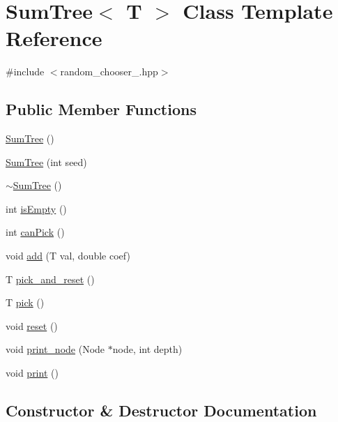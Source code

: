 \hypertarget{class_sum_tree}{}\section{Sum\+Tree$<$ T $>$ Class Template Reference}
\label{class_sum_tree}


{\ttfamily \#include $<$random\+\_\+chooser\+\_.\+hpp$>$}

\subsection*{Public Member Functions}
\begin{DoxyCompactItemize}
\item 
\hyperlink{class_sum_tree_a67f405b8c5b240375da744b9f095b992}{Sum\+Tree} ()
\item 
\hyperlink{class_sum_tree_ad2c193edab658df4c7c8ef84b66f34d1}{Sum\+Tree} (int seed)
\item 
\hyperlink{class_sum_tree_a2b86f01e3bc3a732204b29550c54ef32}{$\sim$\+Sum\+Tree} ()
\item 
int \hyperlink{class_sum_tree_abb0ec0746ac1e34080b52eea7858c723}{is\+Empty} ()
\item 
int \hyperlink{class_sum_tree_a910b8d54b67fb9003a2dbb55061e3180}{can\+Pick} ()
\item 
void \hyperlink{class_sum_tree_ab61ec3e23ac27f181e255648d820a40f}{add} (T val, double coef)
\item 
T \hyperlink{class_sum_tree_a038d15796c15a891f9886f0fdb4ea7b7}{pick\+\_\+and\+\_\+reset} ()
\item 
T \hyperlink{class_sum_tree_a464dc3f669bb2767932bb7bf6f487182}{pick} ()
\item 
void \hyperlink{class_sum_tree_a8dd0f460c03f8545beca35a370b405db}{reset} ()
\item 
void \hyperlink{class_sum_tree_aa25dae8e741a901135afcdc4ac296895}{print\+\_\+node} (Node $\ast$node, int depth)
\item 
void \hyperlink{class_sum_tree_a62581874cf74bce8b458428e28b89947}{print} ()
\end{DoxyCompactItemize}


\subsection{Constructor \& Destructor Documentation}
\mbox{\label{class_sum_tree_a67f405b8c5b240375da744b9f095b992}} 
